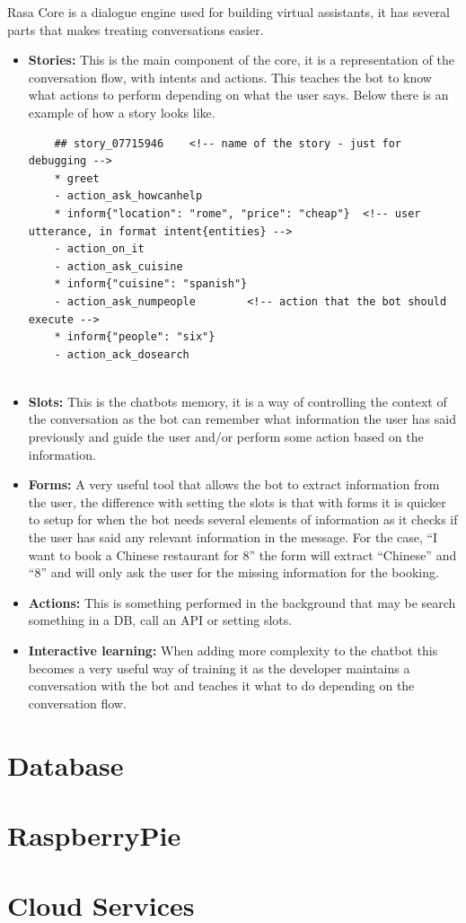 Rasa Core is a dialogue engine used for building virtual assistants, it has several parts that makes treating conversations easier.
\begin{itemize}
	\item {\textbf{Stories:} This is the main component of the core, it is a representation of the conversation flow, with intents and actions. This teaches the bot to know what actions to perform depending on what the user says. Below there is an example of how a story looks like.
	\begin{lstlisting}
	## story_07715946    <!-- name of the story - just for debugging -->
	* greet
	- action_ask_howcanhelp
	* inform{"location": "rome", "price": "cheap"}  <!-- user utterance, in format intent{entities} -->
	- action_on_it
	- action_ask_cuisine
	* inform{"cuisine": "spanish"}
	- action_ask_numpeople        <!-- action that the bot should execute -->
	* inform{"people": "six"}
	- action_ack_dosearch
	
	\end{lstlisting}
	}
	\item {\textbf{Slots:} This is the chatbots memory, it is a way of controlling the context of the conversation as the bot can remember what information the user has said previously and guide the user and/or perform some action based on the information.}
	\item {\textbf{Forms:} A very useful tool that allows the bot to extract information from the user, the difference with setting the slots is that with forms it is quicker to setup for when the bot needs several elements of information as it checks if the user has said any relevant information in the message. For the case, “I want to book a Chinese restaurant for 8” the form will extract “Chinese” and “8” and will only ask the user for the missing information for the booking.}
	\item {\textbf{Actions:} This is something performed in the background that may be search something in a DB, call an API or setting slots.}
	\item {\textbf{Interactive learning:} When adding more complexity to the chatbot this becomes a very useful way of training it as the developer maintains a conversation with the bot and teaches it what to do depending on the conversation flow.}
\end{itemize}

\section{Database}\label{sec:chap3_db}

\section{RaspberryPie}\label{sec:chap3_rasp}
	
\section{Cloud Services}\label{sec:chap3_cloud}

